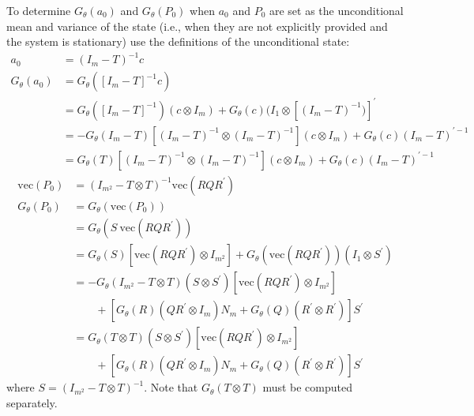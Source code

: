 \documentclass[12pt]{article}
\newcommand{\Gt}{G_\theta}
\newcommand{\vecop}[0]{\text{vec}}
\begin{document}
	To determine $\Gt(a_0)$ and $\Gt(P_0)$ when $a_0$ and $P_0$ are set as the unconditional mean and variance of the state (i.e., when they are not explicitly provided and the system is stationary) use the definitions of the unconditional state:
	\begin{align*}
	a_0 &= (I_m - T)^{-1} c \\
	\Gt(a_0) &= \Gt([I_m - T]^{-1} c) \\ 
		&= \Gt([I_m - T]^{-1}) (c \otimes I_m) + \Gt(c) (I_1 \otimes [(I_m - T)^{-1})]^\prime \\ 
		&= -\Gt(I_m - T) [(I_m - T)^{-1} \otimes (I_m - T)^{-1} ](c \otimes I_m) +  \Gt(c) (I_m - T)^{\prime-1} \\ 
		&= \Gt(T) [(I_m - T)^{-1} \otimes (I_m - T)^{-1}] (c \otimes I_m) +  \Gt(c) (I_m - T)^{\prime-1} 
	\end{align*}
	\begin{align*}
	\vecop(P_0) &= (I_{m^2} - T \otimes T)^{-1} \vecop(RQR^\prime) \\ 
	\Gt(P_0) &= \Gt(\vecop(P_0)) \\
		&= \Gt(S \ \vecop(RQR^\prime))\\
		&= \Gt(S) [\vecop(RQR^\prime) \otimes I_{m^2}] + \Gt(\vecop(RQR^\prime))(I_1 \otimes S^\prime) \\
		&= -\Gt(I_{m^2} - T \otimes T)(S \otimes S^\prime) [\vecop(RQR^\prime) \otimes I_{m^2}]\\ 
		&\qquad + [\Gt(R)(QR^\prime \otimes I_m) N_m + \Gt(Q)(R^\prime \otimes R^\prime)] S^\prime \\
		&= \Gt(T \otimes T)(S \otimes S^\prime) [\vecop(RQR^\prime) \otimes I_{m^2}] \\
		&\qquad + [\Gt(R)(QR^\prime \otimes I_m) N_m + \Gt(Q)(R^\prime \otimes R^\prime)] S^\prime
	\end{align*}
	where $S = (I_{m^2} - T \otimes T)^{-1}$. Note that $\Gt(T \otimes T)$ must be computed separately.


\end{document}
